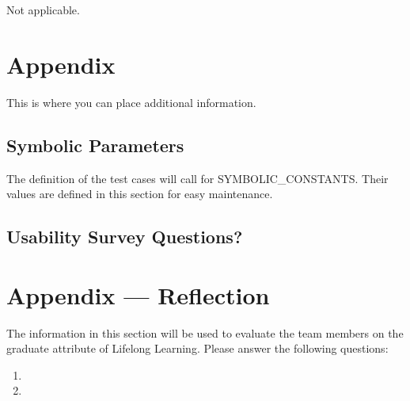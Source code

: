 \documentclass[12pt, titlepage]{article}
\begin{document}
Not applicable.
				




\newpage

\section{Appendix}

This is where you can place additional information.

\subsection{Symbolic Parameters}

The definition of the test cases will call for SYMBOLIC\_CONSTANTS.
Their values are defined in this section for easy maintenance.

\subsection{Usability Survey Questions?}


\newpage{}
\section*{Appendix --- Reflection}

The information in this section will be used to evaluate the team members on the
graduate attribute of Lifelong Learning.  Please answer the following questions:

\begin{enumerate}
  \item 
  \item 
\end{enumerate}
\end{document}
